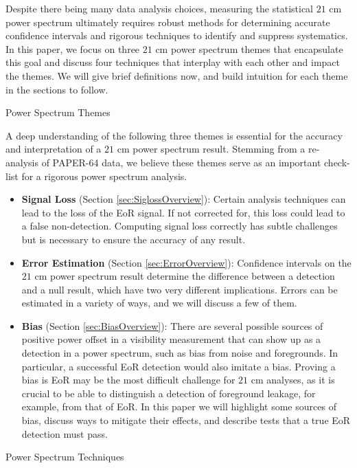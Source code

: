 \documentclass[preprint2,numberedappendix,tighten]{aastex6}  %
\begin{document}
Despite there being many data analysis choices, measuring the statistical $21$ cm power spectrum ultimately requires robust methods for determining accurate confidence intervals and rigorous techniques to identify and suppress systematics.  In this paper, we focus on three $21$ cm power spectrum themes that encapsulate this goal and discuss four techniques that interplay with each other and impact the themes. We will give brief definitions now, and build intuition for each theme in the sections to follow.

\begin{center}
Power Spectrum Themes
\end{center}

A deep understanding of the following three themes is essential for the accuracy and interpretation of a $21$ cm power spectrum result. Stemming from a re-analysis of PAPER-64 data, we believe these themes serve as an important check-list for a rigorous power spectrum analysis.
\begin{itemize}
\item \textbf{Signal Loss} (Section \ref{sec:SiglossOverview}): Certain analysis techniques can lead to the loss of the EoR signal. If not corrected for, this loss could lead to a false non-detection. Computing signal loss correctly has subtle challenges but is necessary to ensure the accuracy of any result. 
\item \textbf{Error Estimation} (Section \ref{sec:ErrorOverview}): Confidence intervals on the $21$ cm power spectrum result determine the difference between a detection and a null result, which have two very different implications. Errors can be estimated in a variety of ways, and we will discuss a few of them.
\item \textbf{Bias} (Section \ref{sec:BiasOverview}): There are several possible sources of positive power offset in a visibility measurement that can show up as a detection in a power spectrum, such as bias from noise and foregrounds. In particular, a successful EoR detection would also imitate a bias. Proving a bias is EoR may be the most difficult challenge for $21$ cm analyses, as it is crucial to be able to distinguish a detection of foreground leakage, for example, from that of EoR. In this paper we will highlight some sources of bias, discuss ways to mitigate their effects, and describe tests that a true EoR detection must pass.
\end{itemize}

\begin{center}
Power Spectrum Techniques
\end{center}
\end{document}
